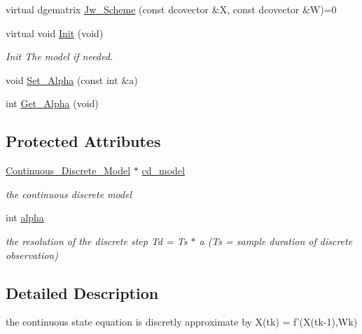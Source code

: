 \begin{CompactItemize}
\item 
virtual dgematrix \hyperlink{class_discrete___approximation___c_d___model_c7496999409a3f05125ceb7fe85e85ab}{Jw\_\-Scheme} (const dcovector \&X, const dcovector \&W)=0
\item 
virtual void \hyperlink{class_discrete___approximation___c_d___model_0c4caaf9a2874a8e5219e72401caf908}{Init} (void)
\begin{CompactList}\small\item\em Init The model if needed. \item\end{CompactList}\item 
void \hyperlink{class_discrete___approximation___c_d___model_b6ebdd0ec42a24390d9446f10f7fa736}{Set\_\-Alpha} (const int \&a)
\item 
int \hyperlink{class_discrete___approximation___c_d___model_37b248fa0e24d9c70145ca546ee2a597}{Get\_\-Alpha} (void)
\end{CompactItemize}
\subsection*{Protected Attributes}
\begin{CompactItemize}
\item 
\hyperlink{class_continuous___discrete___model}{Continuous\_\-Discrete\_\-Model} $\ast$ \hyperlink{class_discrete___approximation___c_d___model_874071f4daae1dce9b15aaf5fc133846}{cd\_\-model}
\begin{CompactList}\small\item\em the continuous discrete model \item\end{CompactList}\item 
int \hyperlink{class_discrete___approximation___c_d___model_8200bfe0f27222f170057ca6d0ca123c}{alpha}
\begin{CompactList}\small\item\em the resolution of the discrete step Td = Ts $\ast$ a (Ts = sample duration of discrete observation) \item\end{CompactList}\end{CompactItemize}


\subsection{Detailed Description}
the continuous state equation is discretly approximate by X(tk) = f'(X(tk-1),Wk) 



